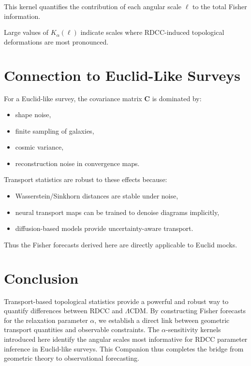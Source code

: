 \documentclass[11pt,a4paper]{article}
\begin{document}
This kernel quantifies the contribution of each angular scale $\ell$ to the total 
Fisher information.

Large values of $K_{\alpha}(\ell)$ indicate scales where RDCC-induced topological 
deformations are most pronounced.
\section{Connection to Euclid-Like Surveys}

For a Euclid-like survey, the covariance matrix $\mathbf{C}$ is dominated by:

\begin{itemize}
    \item shape noise,
    \item finite sampling of galaxies,
    \item cosmic variance,
    \item reconstruction noise in convergence maps.
\end{itemize}

Transport statistics are robust to these effects because:

\begin{itemize}
    \item Wasserstein/Sinkhorn distances are stable under noise,
    \item neural transport maps can be trained to denoise diagrams implicitly,
    \item diffusion-based models provide uncertainty-aware transport.
\end{itemize}

Thus the Fisher forecasts derived here are directly applicable to Euclid mocks.
\section{Conclusion}

Transport-based topological statistics provide a powerful and robust way to 
quantify differences between RDCC and $\Lambda$CDM. By constructing Fisher 
forecasts for the relaxation parameter $\alpha$, we establish a direct link 
between geometric transport quantities and observable constraints. The 
$\alpha$-sensitivity kernels introduced here identify the angular scales most 
informative for RDCC parameter inference in Euclid-like surveys. This Companion 
thus completes the bridge from geometric theory to observational forecasting.


\nocite{*}

\end{document}

